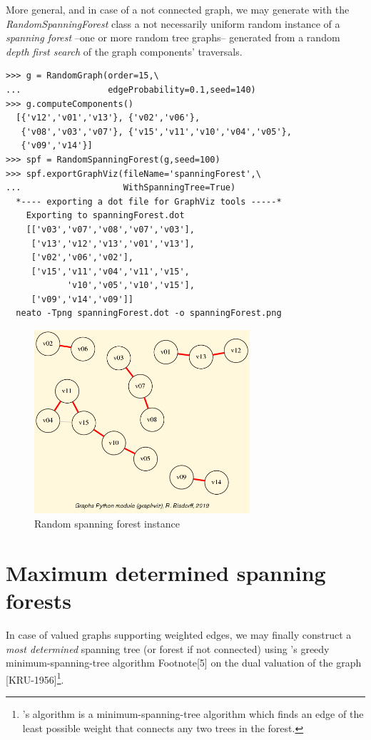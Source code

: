 More general, and in case of a not connected graph, we may generate with the \emph{RandomSpanningForest} class a not necessarily uniform random instance of a \emph{spanning forest} --one or more random tree graphs-- generated from a random \emph{depth first search} of the graph components' traversals.
\begin{lstlisting}
>>> g = RandomGraph(order=15,\
...                 edgeProbability=0.1,seed=140)
>>> g.computeComponents()
  [{'v12','v01','v13'}, {'v02','v06'},
   {'v08','v03','v07'}, {'v15','v11','v10','v04','v05'},
   {'v09','v14'}]
>>> spf = RandomSpanningForest(g,seed=100)
>>> spf.exportGraphViz(fileName='spanningForest',\
...                    WithSpanningTree=True)
  *---- exporting a dot file for GraphViz tools -----*
    Exporting to spanningForest.dot
    [['v03','v07','v08','v07','v03'],
     ['v13','v12','v13','v01','v13'],
     ['v02','v06','v02'],
     ['v15','v11','v04','v11','v15',
            'v10','v05','v10','v15'],
     ['v09','v14','v09']]
  neato -Tpng spanningForest.dot -o spanningForest.png
\end{lstlisting}
\begin{figure}[h]
\sidecaption
\includegraphics[width=8cm]{Figures/spanningForest.png}
\caption{Random spanning forest instance} 
\label{fig:23.6}       %
\end{figure}

\section{Maximum determined spanning forests}
\label{sec:23.3}

In case of valued graphs supporting weighted edges, we may finally construct a \emph{most determined} spanning tree (or forest if not connected) using \Kruskal's greedy minimum-spanning-tree algorithm Footnote[5] on the dual valuation of the graph [KRU-1956]\footnote{\Kruskal's algorithm is a minimum-spanning-tree algorithm which finds an edge of the least possible weight that connects any two trees in the forest.}.

